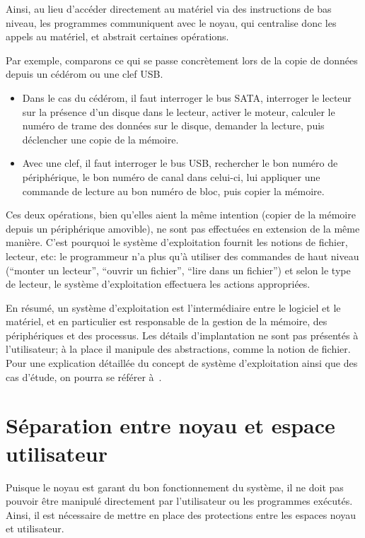 Ainsi, au lieu d'accéder directement au matériel via des instructions de bas
niveau, les programmes communiquent avec le noyau, qui centralise donc les
appels au matériel, et abstrait certaines opérations.

Par exemple, comparons ce qui se passe concrètement lors de la copie de données
depuis un cédérom ou une clef USB.\@

\begin{itemize}

  \item Dans le cas du cédérom, il faut interroger le bus SATA, interroger le
    lecteur sur la présence d'un disque dans le lecteur, activer le moteur,
    calculer le numéro de trame des données sur le disque, demander la lecture,
    puis déclencher une copie de la mémoire.

  \item Avec une clef, il faut interroger le bus USB, rechercher le bon numéro
    de périphérique, le bon numéro de canal dans celui-ci, lui appliquer une
    commande de lecture au bon numéro de bloc, puis copier la mémoire.

\end{itemize}

Ces deux opérations, bien qu'elles aient la même intention (copier de la mémoire
depuis un périphérique amovible), ne sont pas effectuées en extension de la même
manière. C'est pourquoi le système d'exploitation fournit les notions de
fichier, lecteur, etc: le programmeur n'a plus qu'à utiliser des commandes de
haut niveau (``monter un lecteur'', ``ouvrir un fichier'', ``lire dans un
fichier'') et selon le type de lecteur, le système d'exploitation effectuera les
actions appropriées.

En résumé, un système d'exploitation est l'intermédiaire entre le logiciel et le
matériel, et en particulier est responsable de la gestion de la mémoire, des
périphériques et des processus. Les détails d'implantation ne sont pas présentés
à l'utilisateur; à la place il manipule des abstractions, comme la notion de
fichier. Pour une explication détaillée du concept de système d'exploitation
ainsi que des cas d'étude, on pourra se référer à~\cite{tanenbaum}.

\section{Séparation entre noyau et espace utilisateur}

Puisque le noyau est garant du bon fonctionnement du système, il ne doit pas
pouvoir être manipulé directement par l'utilisateur ou les programmes exécutés.
Ainsi, il est nécessaire de mettre en place des protections entre les espaces
noyau et utilisateur.

